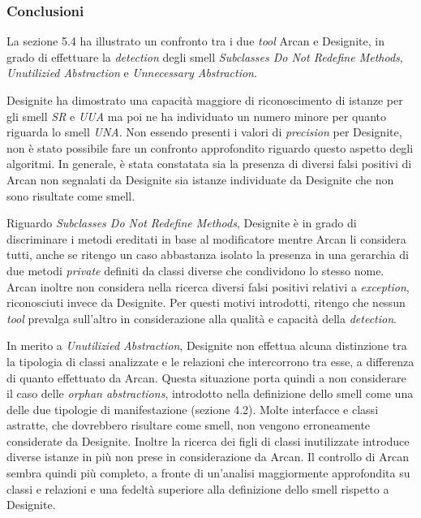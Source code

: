 \subsubsection{Conclusioni}
La sezione 5.4 ha illustrato un confronto tra i due \textit{tool} Arcan e Designite, in grado di effettuare la \textit{detection} degli smell \textit{Subclasses Do Not Redefine Methods}, \textit{Unutilizied Abstraction} e \textit{Unnecessary Abstraction}.

Designite ha dimostrato una capacità maggiore di riconoscimento di istanze per gli smell \textit{SR} e \textit{UUA} ma poi ne ha individuato un numero minore per quanto riguarda lo smell \textit{UNA}. Non essendo presenti i valori di \textit{precision} per Designite, non è stato possibile fare un confronto approfondito riguardo questo aspetto degli algoritmi. In generale, è stata constatata sia la presenza di diversi falsi positivi di Arcan non segnalati da Designite sia istanze individuate da Designite che non sono risultate come smell.

Riguardo \textit{Subclasses Do Not Redefine Methods}, Designite è in grado di discriminare i metodi ereditati in base al modificatore mentre Arcan li considera tutti, anche se ritengo un caso abbastanza isolato la presenza in una gerarchia di due metodi \textit{private} definiti da classi diverse che condividono lo stesso nome. Arcan inoltre non considera nella ricerca diversi falsi positivi relativi a \textit{exception}, riconosciuti invece da Designite. Per questi motivi introdotti, ritengo che nessun \textit{tool} prevalga sull'altro in considerazione alla qualità e capacità della \textit{detection}.

In merito a \textit{Unutilizied Abstraction}, Designite non effettua alcuna distinzione tra la tipologia di classi analizzate e le relazioni che intercorrono tra esse, a differenza di quanto effettuato da Arcan. Questa situazione porta quindi a non considerare il caso delle \textit{orphan abstractions}, introdotto nella definizione dello smell come una delle due tipologie di manifestazione (sezione 4.2). Molte interfacce e classi astratte, che dovrebbero risultare come smell, non vengono erroneamente considerate da Designite.
Inoltre la ricerca dei figli di classi inutilizzate introduce diverse istanze in più non prese in considerazione da Arcan. Il controllo di Arcan sembra quindi più completo, a fronte di un'analisi maggiormente approfondita su classi e relazioni e una fedeltà superiore alla definizione dello smell rispetto a Designite.

